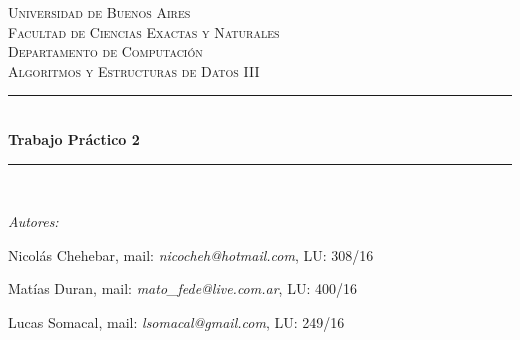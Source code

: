 \documentclass[A4paper,oneside,fleqn,11pt]{article}
\theoremstyle{definition}
\begin{document}

\begin{titlepage}

\center %

\newcommand{\HRule}{\rule{\linewidth}{0.5mm}} %

\textsc{\LARGE Universidad de Buenos Aires}\\[1.5cm] %
\textsc{\Large Facultad de Ciencias Exactas y Naturales}\\[0.5cm] %
\textsc{\large Departamento de Computación}\\[0.5cm] %
\textsc{\large Algoritmos y Estructuras de Datos III}\\[0.5cm] %

\HRule \\[0.8cm]
{ \huge \bfseries Trabajo Práctico 2}\\[0.4cm] %
\HRule \\[1.5cm]

\begin{minipage}{0.8\textwidth}
\center
\Large
\emph{Autores:}


{Nicolás Chehebar, mail: \textit{nicocheh@hotmail.com}, LU: 308/16 

Matías Duran, mail: \textit{mato\_fede@live.com.ar}, LU: 400/16 

Lucas Somacal, mail: \textit{lsomacal@gmail.com}, LU: 249/16} %
~
\end{minipage}\\[4cm]


\vfill %

\end{titlepage}

\end{document}
